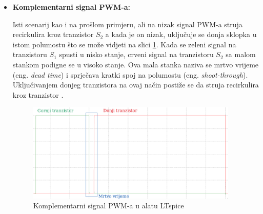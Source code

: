 \documentclass[diplomskirad]{fer}
\begin{document}
\begin{itemize}
	\item \textbf{Komplementarni signal PWM-a:}

	      Isti scenarij kao i na prošlom primjeru, ali na nizak signal PWM-a struja
	      recirkulira kroz tranzistor $S_2$ a kada je on nizak, uključuje se donja
	      sklopka u istom polumostu što se može vidjeti na slici \ref{fig:soft_chopping}.
	      Kada se zeleni signal na tranzistoru $S_1$ spusti u nisko stanje, crveni signal
	      na tranzistoru $S_2$ sa malom stankom podigne se u visoko stanje. Ova mala
	      stanka naziva se mrtvo vrijeme (eng. \textit{dead time}) i sprječava kratki
	      spoj na polumostu (eng. \textit{shoot-through}). Uključivanjem donjeg
	      tranzistora na ovaj način postiže se da struja recirkulira kroz tranzistor
	      \cite{TI2015}. 
	      \begin{figure}[h!]
		      \centering
		      \includegraphics[width=0.95\textwidth]{Figures/soft_chopping.png}
		      \caption{Komplementarni signal PWM-a u alatu LTspice}
		      \label{fig:soft_chopping}
	      \end{figure}

\end{itemize}
\end{document}

